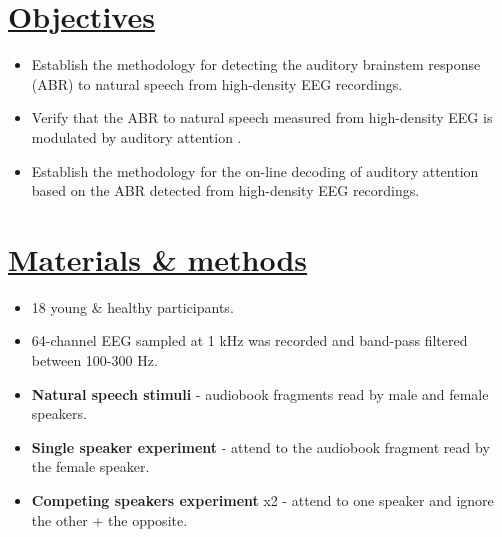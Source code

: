 \documentclass[a0,landscape]{a0poster}
\newenvironment{nitemize}{%
  \begin{itemize}[topsep=6pt,itemsep=2pt,parsep=0pt]%
}{%
  \end{itemize}%
}
\begin{document}
\begin{multicols*}{3}
\section*{\underline{Objectives}}
\vspace{12pt}
\begin{flushleft}
\normalsize
\begin{nitemize}
\item Establish the methodology for detecting the auditory brainstem response (ABR) to natural speech from high-density EEG recordings.
\item Verify that the ABR to natural speech measured from high-density EEG is modulated by auditory attention \cite{Forte2017b}.
\item Establish the methodology for the on-line decoding of auditory attention based on the ABR detected from high-density EEG recordings.
\end{nitemize}
\end{flushleft}


\section*{\underline{Materials \& methods}}
\vspace{12pt}
\begin{flushleft}
\normalsize
\begin{nitemize}
\item 18 young \& healthy participants.
\item 64-channel EEG sampled at 1 kHz was recorded and band-pass filtered between 100-300 Hz.
\item \textbf{Natural speech stimuli} - audiobook fragments read by male and female speakers.
\item \textbf{Single speaker experiment} - attend to the audiobook fragment read by the female speaker.
\item \textbf{Competing speakers experiment} x2 - attend to one speaker and ignore the other + the opposite.
\end{nitemize}
\end{flushleft}

\end{multicols*}
\end{document}
